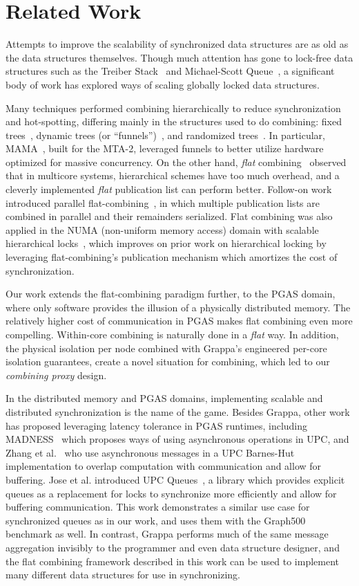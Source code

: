 \section{Related Work}
Attempts to improve the scalability of synchronized data structures are as old as the data structures themselves. Though much attention has gone to lock-free data structures such as the Treiber Stack~\cite{treiber} and Michael-Scott Queue~\cite{msqueue}, a significant body of work has explored ways of scaling globally locked data structures.

Many techniques performed combining hierarchically to reduce synchronization and hot-spotting, differing mainly in the structures used to do combining: fixed trees~\cite{yew:combining-trees}, dynamic trees (or ``funnels'')~\cite{funnels,MAMA}, and randomized trees~\cite{edtrees}. In particular, MAMA~\cite{MAMA}, built for the MTA-2, leveraged funnels to better utilize hardware optimized for massive concurrency.
On the other hand, \emph{flat} combining~\cite{flatCombining} observed that in multicore systems, hierarchical schemes have too much overhead, and a cleverly implemented \emph{flat} publication list can perform better.
Follow-on work introduced parallel flat-combining~\cite{scalableFCQueues}, in which multiple publication lists are combined in parallel and their remainders serialized.
Flat combining was also applied in the NUMA (non-uniform memory access) domain with scalable hierarchical locks~\cite{fcNUMALocks}, which improves on prior work on hierarchical locking by leveraging flat-combining's publication mechanism which amortizes the cost of synchronization.

Our work extends the flat-combining paradigm further, to the PGAS domain, where only software provides the illusion of a physically distributed memory. The relatively higher cost of communication in PGAS makes flat combining even more compelling. Within-core combining is naturally done in a \emph{flat} way. In addition, the physical isolation per node combined with Grappa's engineered per-core isolation guarantees, create a novel situation for combining, which led to our \emph{combining proxy} design.

In the distributed memory and PGAS domains, implementing scalable and distributed synchronization is the name of the game.
Besides Grappa, other work has proposed leveraging latency tolerance in PGAS runtimes, including MADNESS~\cite{shet:async-upc} which proposes ways of using asynchronous operations in UPC, and Zhang et al.~\cite{zhang:barnes-hut} who use asynchronous messages in a UPC Barnes-Hut implementation to overlap computation with communication and allow for buffering.
Jose et al. introduced UPC Queues~\cite{jose:upc-queues}, a library which provides explicit queues as a replacement for locks to synchronize more efficiently and allow for buffering communication. This work demonstrates a similar use case for synchronized queues as in our work, and uses them with the Graph500 benchmark as well. In contrast, Grappa performs much of the same message aggregation invisibly to the programmer and even data structure designer, and the flat combining framework described in this work can be used to implement many different data structures for use in synchronizing.

